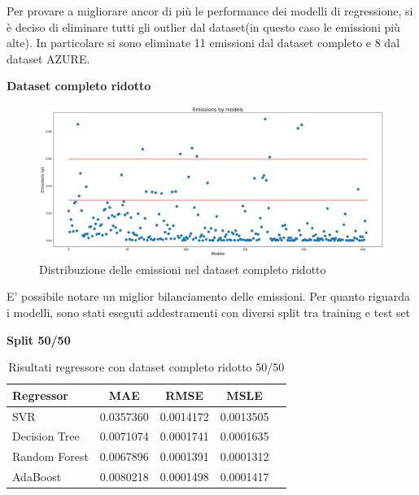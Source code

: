 Per provare a migliorare ancor di più le performance dei modelli di regressione, si è deciso di eliminare tutti gli outlier dal dataset(in questo caso le emissioni più alte). In particolare si sono eliminate 11 emissioni dal dataset completo e 8 dal dataset AZURE.

\noindent \textbf{Dataset completo ridotto}



\begin{figure}[H]
    \centering
    \includegraphics[width=\textwidth]{images/nuova-situazione-ridotto.png}
    \caption{Distribuzione delle emissioni nel dataset completo ridotto}
\end{figure}

\noindent E' possibile notare un miglior bilanciamento delle emissioni. Per quanto riguarda i modelli, sono stati eseguti addestramenti con diversi split tra training e test set

\noindent\textbf{Split 50/50}


\begin{table}[H]
    \centering
    \begin{tabular}{|>{\centering\arraybackslash}m{5cm}|c|c|c|c|}
        \hline
        \textbf{Regressor} & \textbf{MAE} & \textbf{RMSE} & \textbf{MSLE} \\ [10pt]
        \hline
        SVR & 0.0357360 & 0.0014172 & 0.0013505 \\ [10pt]
        \hline
        Decision Tree & 0.0071074 & 0.0001741 & 0.0001635 \\ [10pt]
        \hline
        Random Forest & 0.0067896 & 0.0001391 & 0.0001312 \\ [10pt]
        \hline
        AdaBoost & 0.0080218 & 0.0001498 & 0.0001417 \\ [10pt]
        \hline
    \end{tabular}
    \caption{Risultati regressore con dataset completo ridotto 50/50}
    \label{tab:results}
\end{table}

